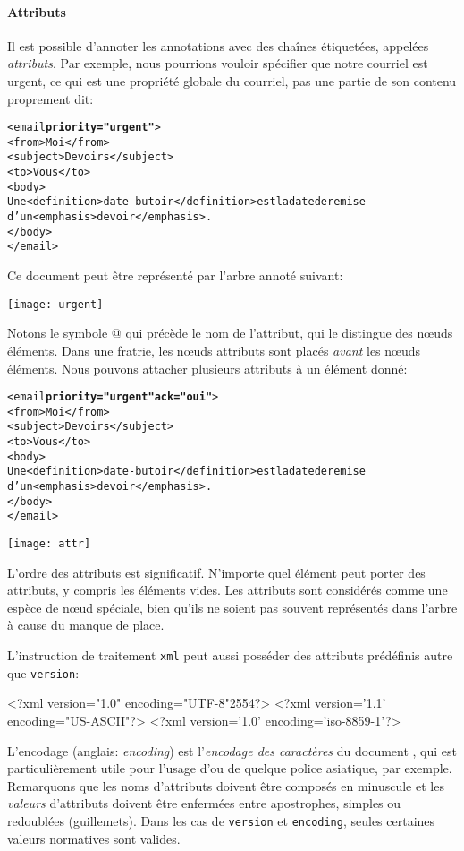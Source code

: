 \paragraph{Attributs}

Il est possible d'annoter les annotations avec des chaînes
étiquetées, appelées \emph{attributs}. Par exemple, nous pourrions
vouloir spécifier que notre courriel est urgent, ce qui est une
propriété globale du courriel, pas une partie de son contenu
proprement dit:
\begin{alltt}
\small<email \textbf{priority="urgent"}>
  <from>Moi</from>
  <subject>Devoirs</subject>
  <to>Vous</to>
  <body>
  Une <definition>date-butoir</definition> est la date de remise
d'un <emphasis>devoir</emphasis>.
  </body>
</email>
\end{alltt}
Ce document \XML peut être représenté par l'arbre annoté suivant:
\begin{center}
\texttt{[image: urgent]}
\end{center}
Notons le symbole \textsf{@} qui précède le nom de l'attribut, qui le
distingue des nœuds éléments. Dans une fratrie, les nœuds
attributs sont placés \emph{avant}\label{attr_before} les nœuds
éléments. Nous pouvons attacher plusieurs attributs à un élément
donné:
\begin{alltt}
\small<email \textbf{priority="urgent"} \textbf{ack="oui"}>
  <from>Moi</from>
  <subject>Devoirs</subject>
  <to>Vous</to>
  <body>
  Une <definition>date-butoir</definition> est la date de remise
d'un <emphasis>devoir</emphasis>.
  </body>
</email>
\end{alltt}
\begin{center}
\texttt{[image: attr]}
\end{center}
L'ordre des attributs est significatif. N'importe quel élément peut
porter des attributs, y compris les éléments vides. Les attributs sont
considérés comme une espèce de nœud spéciale, bien qu'ils ne
soient pas souvent représentés dans l'arbre \XML à cause du manque de
place.

L'instruction de traitement \texttt{xml} peut aussi posséder des
attributs prédéfinis autre que \verb|version|:
\begin{sverb}
<?xml version="1.0" encoding="UTF-8"2554?>
<?xml version='1.1' encoding="US-ASCII"?>
<?xml version='1.0' encoding='iso-8859-1'?>
\end{sverb}
L'encodage (anglais: \emph{encoding}) est l'\emph{encodage
  des caractères} du document \XML, qui est particulièrement utile
pour l'usage d'\Unicode ou de quelque police asiatique, par
exemple. Remarquons que les noms d'attributs doivent être composés en
minuscule et les \emph{valeurs} d'attributs doivent être enfermées
entre apostrophes, simples ou redoublées (guillemets). Dans les cas de
\verb|version| et \verb|encoding|, seules certaines valeurs normatives
sont valides.

